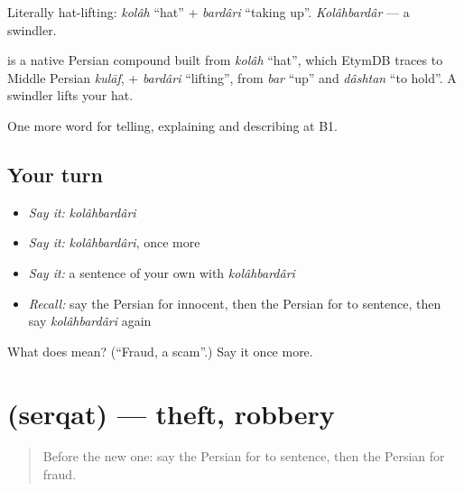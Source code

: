 Literally hat-lifting: \emph{kolâh} \textquotedblleft{}hat\textquotedblright{} + \emph{bardâri} \textquotedblleft{}taking up\textquotedblright{}. \emph{Kolâhbardâr} — a swindler.

\begin{cousinweb}
\textbf{} is a native Persian compound built from \emph{kolâh} \textquotedblleft{}hat\textquotedblright{}, which EtymDB traces to Middle Persian \emph{kulāf}, + \emph{bardâri} \textquotedblleft{}lifting\textquotedblright{}, from \emph{bar} \textquotedblleft{}up\textquotedblright{} and \emph{dâshtan} \textquotedblleft{}to hold\textquotedblright{}. A swindler lifts your hat.
\end{cousinweb}

\begin{grammarlens}[title={What you've built}]
One more word for telling, explaining and describing at B1.
\end{grammarlens}

\subsection*{Your turn}
\begin{itemize}
\raggedright
  \item \emph{Say it:} \emph{kolâhbardâri}
  \item \emph{Say it:} \emph{kolâhbardâri}, once more
  \item \emph{Say it:} a sentence of your own with \emph{kolâhbardâri}
  \item \emph{Recall:} say the Persian for innocent, then the Persian for to sentence, then say \emph{kolâhbardâri} again
\end{itemize}

\begin{tcolorbox}[breakable,colback=teal!4,colframe=teal!35!black,title={Before you move on}]
What does  mean? (\textquotedblleft{}Fraud, a scam\textquotedblright{}.) Say it once more.
\end{tcolorbox}
\section[\texorpdfstring{\fa{سرقت} (serqat)}{سرقت (serqat)}]{ (serqat) — theft, robbery}

\label{lesson:FA-C408-serqat}



\begin{quote}
Before the new one: say the Persian for to sentence, then the Persian for fraud.
\end{quote}

